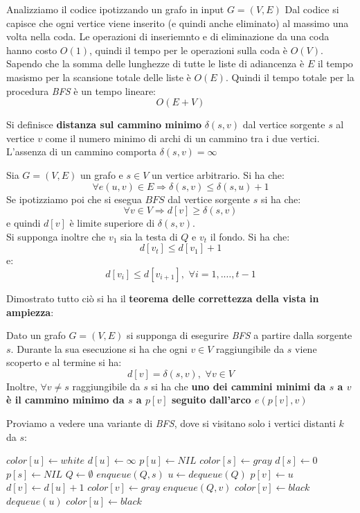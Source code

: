 \documentclass[a4paper,12pt, oneside]{book}
\begin{document}
Analizziamo il codice ipotizzando un grafo in input $G=(V,E)$
Dal codice si capisce che ogni vertice viene inserito (e quindi anche
eliminato) al massimo una volta nella coda. Le operazioni di
inseriemnto e di eliminazione da una coda hanno costo $O(1)$, quindi
il tempo per le operazioni sulla coda è $O(V)$. Sapendo che la somma
delle lunghezze di tutte le liste di adiancenza è $E$ il tempo masismo
per la scansione totale delle liste è $O(E)$. Quindi il tempo totale
per la procedura \textit{BFS} è un tempo lineare:
\[O(E+V)\]
\begin{definizione}
  Si definisce \textbf{distanza sul cammino minimo} $\delta(s,v)$ dal
  vertice sorgente $s$ al vertice $v$ come il numero minimo di archi
  di un cammino tra i due vertici. L'assenza di un cammino comporta $\delta(s,v)=\infty$
\end{definizione}
\begin{lemma}
  Sia $G=(V,E)$ un grafo e $s\in V$ un vertice arbitrario. Si ha che:
  \[\forall e(u,v)\in E \Longrightarrow \delta(s,v)\leq\delta(s,u)+1\]
  Se ipotizziamo poi che si esegua $BFS$ dal vertice sorgente $s$ si
  ha che:
  \[\forall v\in V \Longrightarrow d[v]\geq \delta(s,v)\]
  e quindi $d[v]$ è limite superiore di $\delta(s,v)$.\\
  Si supponga inoltre che $v_1$ sia la testa di $Q$ e $v_t$ il
  fondo. Si ha che:
  \[d[v_t]\leq d[v_1]+1\]
  e:
  \[d[v_i]\leq d[v_{i+1}],\,\, \forall i=1,.\ldots, t-1\]
\end{lemma}
Dimostrato tutto ciò si ha il \textbf{teorema delle correttezza della
  vista in ampiezza}:
\begin{teorema}
  Dato un grafo $G=(V,E)$ si supponga di esegurire \textit{BFS} a
  partire dalla sorgente $s$. Durante la sua esecuzione si ha che
  ogni $v\in V$ raggiungibile da $s$ viene scoperto e al termine si
  ha:
  \[d[v]=\delta(s,v),\,\,\forall v\in V\]
  Inoltre, $\forall v\neq s$ raggiungibile da $s$ si ha che
  \textbf{uno dei cammini minimi da $s$ a $v$ è il cammino minimo da
    $s$ a $p[v]$ seguito dall'arco $e(p[v],v)$}
\end{teorema}
Proviamo a vedere una variante di \textit{BFS}, dove si visitano solo
i vertici distanti $k$ da $s$:
\begin{algorithm}
  \begin{algorithmic}[1]
    \State $color[u]\gets white$
    \State $d[u]\gets \infty$
    \State $p[u]\gets NIL$
    \EndFor
    \State $color[s]\gets gray$
    \State $d[s]\gets 0$
    \State $p[s]\gets NIL$
    \State $Q\gets \emptyset$
    \State $enqueue(Q,s)$
    \State $u\gets dequeue(Q)$
    \State $p[v]\gets u$
    \State $d[v]\gets d[u]+1$
    \State $color[v]\gets gray$
    \State $enqueue(Q,v)$
    \Else
    \State $color[v]\gets black$
    \EndIf
    \EndIf
    \EndFor
    \State $dequeue(u)$
    \State $color[u]\gets black$ 
    \EndWhile
    \EndFunction
  \end{algorithmic}
\end{algorithm}
\end{document}
